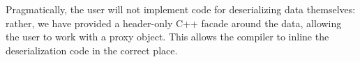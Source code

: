 Pragmatically, the user will not implement code for deserializing data themselves: rather, we have provided a header-only C++ facade around the data, allowing the user to work with a proxy object.  This allows the compiler to inline the deserialization code in the correct place.







